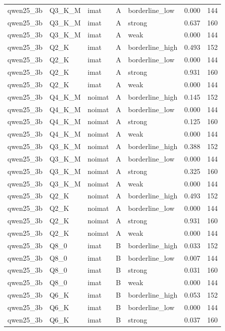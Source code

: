 \begin{tabular}{lllllrr}
qwen25\_3b & Q3\_K\_M & imat & A & borderline\_low & 0.000 & 144 \\
qwen25\_3b & Q3\_K\_M & imat & A & strong & 0.637 & 160 \\
qwen25\_3b & Q3\_K\_M & imat & A & weak & 0.000 & 144 \\
qwen25\_3b & Q2\_K & imat & A & borderline\_high & 0.493 & 152 \\
qwen25\_3b & Q2\_K & imat & A & borderline\_low & 0.000 & 144 \\
qwen25\_3b & Q2\_K & imat & A & strong & 0.931 & 160 \\
qwen25\_3b & Q2\_K & imat & A & weak & 0.000 & 144 \\
qwen25\_3b & Q4\_K\_M & noimat & A & borderline\_high & 0.145 & 152 \\
qwen25\_3b & Q4\_K\_M & noimat & A & borderline\_low & 0.000 & 144 \\
qwen25\_3b & Q4\_K\_M & noimat & A & strong & 0.125 & 160 \\
qwen25\_3b & Q4\_K\_M & noimat & A & weak & 0.000 & 144 \\
qwen25\_3b & Q3\_K\_M & noimat & A & borderline\_high & 0.388 & 152 \\
qwen25\_3b & Q3\_K\_M & noimat & A & borderline\_low & 0.000 & 144 \\
qwen25\_3b & Q3\_K\_M & noimat & A & strong & 0.325 & 160 \\
qwen25\_3b & Q3\_K\_M & noimat & A & weak & 0.000 & 144 \\
qwen25\_3b & Q2\_K & noimat & A & borderline\_high & 0.493 & 152 \\
qwen25\_3b & Q2\_K & noimat & A & borderline\_low & 0.000 & 144 \\
qwen25\_3b & Q2\_K & noimat & A & strong & 0.931 & 160 \\
qwen25\_3b & Q2\_K & noimat & A & weak & 0.000 & 144 \\
qwen25\_3b & Q8\_0 & imat & B & borderline\_high & 0.033 & 152 \\
qwen25\_3b & Q8\_0 & imat & B & borderline\_low & 0.007 & 144 \\
qwen25\_3b & Q8\_0 & imat & B & strong & 0.031 & 160 \\
qwen25\_3b & Q8\_0 & imat & B & weak & 0.000 & 144 \\
qwen25\_3b & Q6\_K & imat & B & borderline\_high & 0.053 & 152 \\
qwen25\_3b & Q6\_K & imat & B & borderline\_low & 0.000 & 144 \\
qwen25\_3b & Q6\_K & imat & B & strong & 0.037 & 160 \\

\end{tabular}
